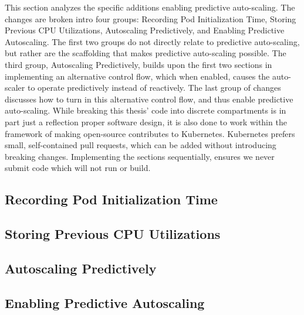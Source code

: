 This section analyzes the specific additions enabling predictive auto-scaling.
The changes are broken intro four groups: Recording Pod Initialization Time,
Storing Previous CPU Utilizations, Autoscaling Predictively, and Enabling
Predictive Autoscaling. The first two groups do not directly relate to
predictive auto-scaling, but rather are the scaffolding that makes predictive
auto-scaling possible. The third group, Autoscaling Predictively, builds upon
the first two sections in implementing an alternative control flow, which when
enabled, causes the auto-scaler to operate predictively instead of reactively.
The last group of changes discusses how to turn in this alternative control
flow, and thus enable predictive auto-scaling. While breaking this thesis' code
into discrete compartments is in part just a reflection proper software design,
it is also done to work within the framework of making open-source contributes
to Kubernetes. Kubernetes prefers small, self-contained pull requests, which can
be added without introducing breaking changes. Implementing the sections sequentially, ensures
we never submit code which will not run or build.

\subsection{Recording Pod Initialization Time}



\subsection{Storing Previous CPU Utilizations}



\subsection{Autoscaling Predictively}



\subsection{Enabling Predictive Autoscaling}


